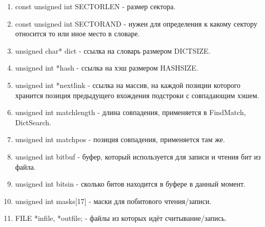 \documentclass[12pt]{article}
\begin{document}
\begin{enumerate}
	\item const unsigned int SECTORLEN  - размер сектора.
	\item const unsigned int SECTORAND  - нужен для определения к какому сектору относится то или иное место в словаре.
	\item unsigned char* dict - ссылка на словарь размером DICTSIZE.
	\item unsigned int *hash - ссылка на хэш размером HASHSIZE.
	\item unsigned int *nextlink - ссылка на массив, на каждой позиции которого хранится позиция предыдущего вхождения подстроки с совпадающим хэшем.
	\item unsigned int matchlength - длина совпадения, применяется в FindMatch, DictSearch.
	\item unsigned int  matchpos - позиция совпадения, применяется там же.
	\item unsigned int  bitbuf - буфер, который используется для записи и чтения бит из файла.
	\item unsigned int  bitsin - сколько битов находится в буфере в данный момент.
	\item unsigned int  masks[17] - маски для побитового чтения/записи.
	\item FILE *infile, *outfile; - файлы из которых идёт считывание/запись.
\end{enumerate}
\end{document}
